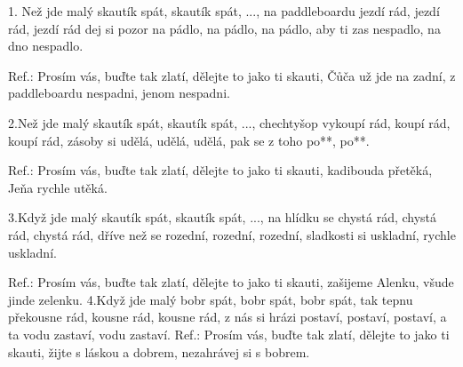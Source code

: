 
1. Než jde malý skautík spát, skautík spát, ...,
na paddleboardu jezdí rád, jezdí rád, jezdí rád
dej si pozor na pádlo, na pádlo, na pádlo,
aby ti zas nespadlo, na dno nespadlo.

Ref.: Prosím vás, buďte tak zlatí,
dělejte to jako ti skauti,
Čůča už jde na zadní,
z paddleboardu nespadni, jenom nespadni.

2.Než jde malý skautík spát, skautík spát, ...,
chechtyšop vykoupí rád, koupí rád, koupí rád,
zásoby si udělá, udělá, udělá,
pak se z toho po**, po**.

Ref.: Prosím vás, buďte tak zlatí,
dělejte to jako ti skauti,
kadibouda přetěká,
Jeňa rychle utěká.

3.Když jde malý skautík spát, skautík spát, ...,
na hlídku se chystá rád, chystá rád, chystá rád,
dříve než se rozední, rozední, rozední,
sladkosti si uskladní, rychle uskladní.

Ref.: Prosím vás, buďte tak zlatí,
dělejte to jako ti skauti,
zašijeme Alenku,
všude jinde zelenku.
4.Když jde malý bobr spát, bobr spát, bobr spát,
tak tepnu překousne rád, kousne rád, kousne rád,
z nás si hrázi postaví, postaví, postaví,
a ta vodu zastaví, vodu zastaví.
Ref.: Prosím vás, buďte tak zlatí,
dělejte to jako ti skauti,
žijte s láskou a dobrem,
nezahrávej si s bobrem.

